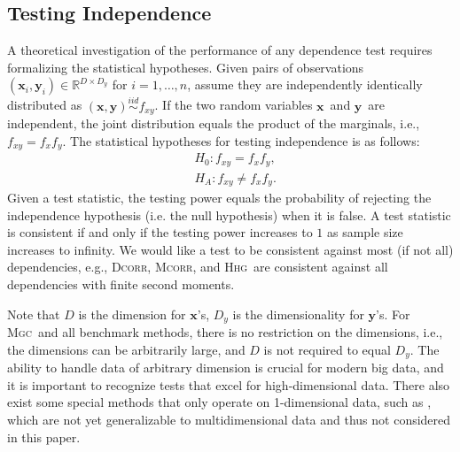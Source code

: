 \documentclass[11pt]{article}
\providecommand{\sct}[1]{{\normalfont\textsc{#1}}}
\providecommand{\mb}[1]{\boldsymbol{#1}}
\newcommand{\Real}{\mathbb{R}}
\newcommand{\Mgc}{\sct{Mgc}}
\newcommand{\Hhg}{\sct{Hhg}}
\newcommand{\Dcorr}{\sct{Dcorr}}
\newcommand{\Mcorr}{\sct{Mcorr}}
\newcommand{\mbx}{\ensuremath{\mb{x}}}
\newcommand{\mby}{\ensuremath{\mb{y}}}
\newcommand{\iid}{\overset{iid}{\sim}}
\begin{document}
\subsection{Testing Independence}

A theoretical investigation of the performance of any dependence test requires formalizing the statistical hypotheses.
 Given pairs of observations $(\mb{x}_{i},\mb{y}_{i}) \in \Real^{D \times D_y}$ for $i=1,\ldots,n$, assume they are independently identically distributed as $(\mbx,\mby) \iid f_{xy}$. If the two random variables \mbx~and \mby~are independent, the joint distribution equals the product of the marginals, i.e., $f_{xy}=f_x f_y$.  The statistical hypotheses for testing independence is as follows:
\begin{align*}
& H_{0}: f_{xy}=f_{x}f_{y},\\
& H_{A}: f_{xy} \neq f_{x}f_{y}.
\end{align*}
Given a test statistic, the testing power equals the probability of rejecting the independence hypothesis (i.e. the null hypothesis) when it is false. A test statistic is consistent if and only if the testing power increases to $1$ as sample size increases to infinity. We would like a test to be consistent against most (if not all) dependencies, e.g., \Dcorr, \Mcorr, and \Hhg~are consistent against all dependencies with finite second moments. %
% 
% 

Note that $D$ is the dimension for $\mb{x}$'s, $D_y$ is the dimensionality for $\mb{y}$'s. For \Mgc~and all benchmark methods, there is no restriction on the dimensions, i.e., the dimensions can be arbitrarily large, and $D$ is not required to equal $D_y$. The ability to handle data of arbitrary dimension is crucial for modern big data, and it is important to recognize tests that excel for high-dimensional data. There also exist some special methods that only operate on 1-dimensional data, such as \cite{Reshef2011,heller2016consistent,Huo2016}, which are not yet generalizable to multidimensional data and thus not considered in this paper.
% 
% 
\end{document}
